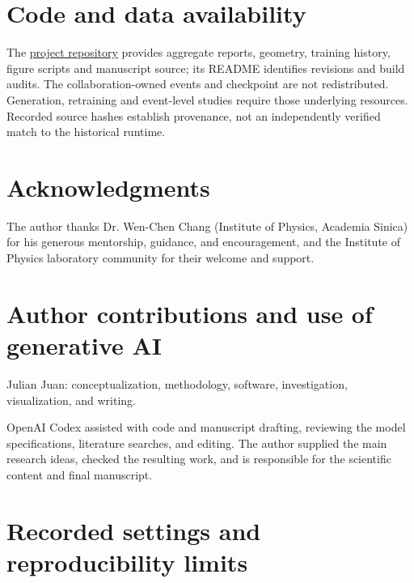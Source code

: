 \documentclass[11pt]{article}
\begin{document}
\section*{Code and data availability}

The \href{https://github.com/JulianAttemptsCoding/fast-mc-paper}{project repository} provides aggregate reports, geometry, training history, figure scripts and manuscript source; its README identifies revisions and build audits. The collaboration-owned events and checkpoint are not redistributed. Generation, retraining and event-level studies require those underlying resources. Recorded source hashes establish provenance, not an independently verified match to the historical runtime.

\section*{Acknowledgments}

The author thanks Dr. Wen-Chen Chang (Institute of Physics, Academia Sinica) for his generous mentorship, guidance, and encouragement, and the Institute of Physics laboratory community for their welcome and support.

\section*{Author contributions and use of generative AI}

Julian Juan: conceptualization, methodology, software, investigation, visualization, and writing.

OpenAI Codex assisted with code and manuscript drafting, reviewing the model specifications, literature searches, and editing. The author supplied the main research ideas, checked the resulting work, and is responsible for the scientific content and final manuscript.


\clearpage
\appendix
\section{Recorded settings and reproducibility limits}
\label{app:reproducibility}
\end{document}
